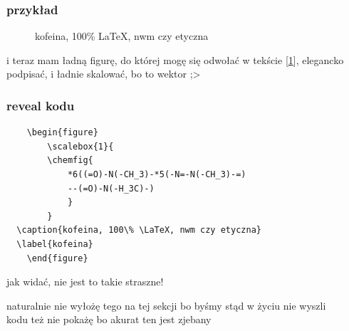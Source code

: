 \documentclass{beamer}
\theoremstyle{newblock}
\begin{document}
\begin{frame}
    \frametitle{przykład}
    \begin{figure}
  \caption{kofeina, 100\% \LaTeX, nwm czy etyczna}
  \label{kofeina}
    \end{figure}
i teraz mam ładną figurę, do której mogę się odwołać w tekście [\ref{kofeina}], elegancko podpisać, i ładnie skalować, bo to wektor ;>
\end{frame}
\begin{frame}[fragile]
    \frametitle{reveal kodu}
    \begin{verbatim}
    \begin{figure}
        \scalebox{1}{
        \chemfig{
            *6((=O)-N(-CH_3)-*5(-N=-N(-CH_3)-=)
            --(=O)-N(-H_3C)-)
            }
        }
  \caption{kofeina, 100\% \LaTeX, nwm czy etyczna}
  \label{kofeina}
    \end{figure}
    \end{verbatim}
\end{frame}
\begin{frame}[standout]
    jak widać, nie jest to takie straszne!
\end{frame}
\begin{frame}
    \begin{figure}
\end{figure}
\pause naturalnie nie wyłożę tego na tej sekcji bo byśmy stąd w życiu nie wyszli \\
\pause kodu też nie pokażę bo akurat ten jest zjebany
\end{frame}
\end{document}
